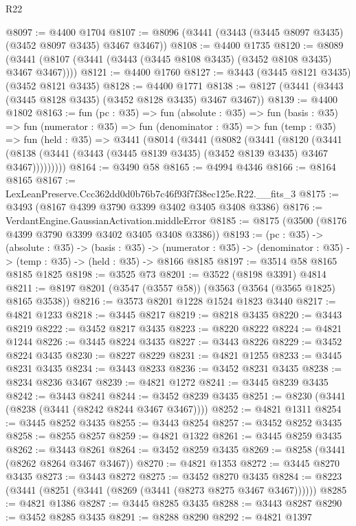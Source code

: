 \begin{lexlean}{R22}
\begin{coremodule}
@8097 := @4400 @1704
@8107 := @8096 (@3441 (@3443 (@3445 @8097 @3435) (@3452 @8097 @3435) @3467 @3467))
@8108 := @4400 @1735
@8120 := @8089 (@3441 (@8107 (@3441 (@3443 (@3445 @8108 @3435) (@3452 @8108 @3435) @3467 @3467))))
@8121 := @4400 @1760
@8127 := @3443 (@3445 @8121 @3435) (@3452 @8121 @3435)
@8128 := @4400 @1771
@8138 := @8127 (@3441 (@3443 (@3445 @8128 @3435) (@3452 @8128 @3435) @3467 @3467))
@8139 := @4400 @1802
@8163 := fun (pc : @35) =>
  fun (absolute : @35) =>
  fun (basis : @35) =>
  fun (numerator : @35) =>
  fun (denominator : @35) =>
  fun (temp : @35) =>
  fun (held : @35) =>
  @3441
    (@8014
      (@3441
        (@8082
          (@3441
            (@8120
              (@3441
                (@8138 (@3441 (@3443 (@3445 @8139 @3435) (@3452 @8139 @3435) @3467 @3467)))))))))
@8164 := @3490 @58
@8165 := @4994 @4346
@8166 := @8164 @8165
@8167 := LexLeanPreserve.Ccc362dd0d0b76b7c46f93f7f38ec125e.R22.__fits_3
@8175 := @3493 (@8167 @4399 @3790 @3399 @3402 @3405 @3408 @3386)
@8176 := VerdantEngine.GaussianActivation.middleError
@8185 := @8175 (@3500 (@8176 @4399 @3790 @3399 @3402 @3405 @3408 @3386))
@8193 := (pc : @35) ->
  (absolute : @35) ->
  (basis : @35) ->
  (numerator : @35) -> (denominator : @35) -> (temp : @35) -> (held : @35) -> @8166 @8185
@8197 := @3514 @58 @8165 @8185 @1825
@8198 := @3525 @73
@8201 := @3522 (@8198 @3391) @4814
@8211 := @8197 @8201 (@3547 (@3557 @58)) (@3563 (@3564 (@3565 @1825) @8165 @3538))
@8216 := @3573 @8201 @1228 @1524 @1823 @3440
@8217 := @4821 @1233
@8218 := @3445 @8217
@8219 := @8218 @3435
@8220 := @3443 @8219
@8222 := @3452 @8217 @3435
@8223 := @8220 @8222
@8224 := @4821 @1244
@8226 := @3445 @8224 @3435
@8227 := @3443 @8226
@8229 := @3452 @8224 @3435
@8230 := @8227 @8229
@8231 := @4821 @1255
@8233 := @3445 @8231 @3435
@8234 := @3443 @8233
@8236 := @3452 @8231 @3435
@8238 := @8234 @8236 @3467
@8239 := @4821 @1272
@8241 := @3445 @8239 @3435
@8242 := @3443 @8241
@8244 := @3452 @8239 @3435
@8251 := @8230 (@3441 (@8238 (@3441 (@8242 @8244 @3467 @3467))))
@8252 := @4821 @1311
@8254 := @3445 @8252 @3435
@8255 := @3443 @8254
@8257 := @3452 @8252 @3435
@8258 := @8255 @8257
@8259 := @4821 @1322
@8261 := @3445 @8259 @3435
@8262 := @3443 @8261
@8264 := @3452 @8259 @3435
@8269 := @8258 (@3441 (@8262 @8264 @3467 @3467))
@8270 := @4821 @1353
@8272 := @3445 @8270 @3435
@8273 := @3443 @8272
@8275 := @3452 @8270 @3435
@8284 := @8223 (@3441 (@8251 (@3441 (@8269 (@3441 (@8273 @8275 @3467 @3467))))))
@8285 := @4821 @1386
@8287 := @3445 @8285 @3435
@8288 := @3443 @8287
@8290 := @3452 @8285 @3435
@8291 := @8288 @8290
@8292 := @4821 @1397

\end{coremodule}
\end{lexlean}
